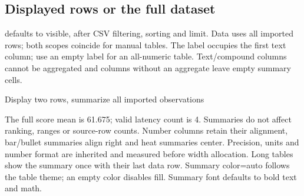 \subsection{Displayed rows or the full dataset}
\begin{sloppypar}
 defaults to visible, after CSV
filtering, sorting and limit. Data uses all imported rows; both scopes coincide
for manual tables. The label occupies the first text column; use an empty label
for an all-numeric table. Text/compound columns cannot be aggregated and columns
without an aggregate leave empty summary cells.
\end{sloppypar}
\begin{demo}{Display two rows, summarize all imported observations}
\begin{center}
\begin{gradtable}[align=c,header align=c,style=compact,data=results,width=\linewidth,
  sort=score,order=descending,limit=2]
\end{gradtable}
\end{center}
\end{demo}
The full score mean is 61.675; valid latency count is 4. Summaries do not affect
ranking, ranges or source-row counts. Number columns retain their alignment,
bar/bullet summaries align right and heat summaries center. Precision, units
and number format are inherited and measured before width allocation. Long
tables show the summary once with their last data row. Summary color=auto follows
the table theme; an empty color disables fill. Summary font defaults to bold text
and math.

